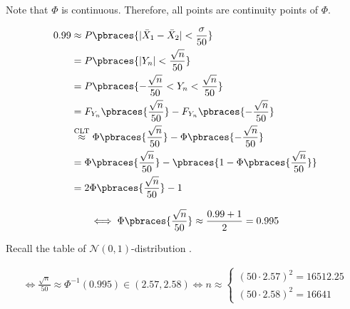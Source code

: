 \begin{solution}
Note that $\Phi$ is continuous.
Therefore, all points are continuity points of $\Phi$.

\begin{align*}
    0.99
    & \approx
    P \pbraces{|\bar X_1 - \bar X_2| < \frac{\sigma}{50}} \\
    & =
    P \pbraces{|Y_n| < \frac{\sqrt n}{50}} \\
    & =
    P \pbraces{-\frac{\sqrt n}{50} < Y_n < \frac{\sqrt n}{50}} \\
    & =
    F_{Y_n} \pbraces{\frac{\sqrt n}{50}} - F_{Y_n} \pbraces{-\frac{\sqrt n}{50}} \\
    & \stackrel
    {
        \text{CLT}
    }{\approx}
    \Phi \pbraces{\frac{\sqrt n}{50}} - \Phi \pbraces{-\frac{\sqrt n}{50}} \\
    & =
    \Phi \pbraces{\frac{\sqrt n}{50}} - \pbraces{1 - \Phi \pbraces{\frac{\sqrt n}{50}}} \\
    & =
    2 \Phi \pbraces{\frac{\sqrt n}{50}} - 1
\end{align*}

\begin{align*}
    \iff
    \Phi \pbraces{\frac{\sqrt n}{50}}
    \approx
    \frac{0.99 + 1}{2}
    =
    0.995
\end{align*}

Recall the table of $\mathcal N(0, 1)$-distribution \cite[Lecture 2, Slide 44]{EStat}.

\begin{align*}
    \iff
    \frac{\sqrt n}{50} \approx \Phi^{-1}(0.995) \in (2.57, 2.58)
    \iff
    n
    \approx
    \begin{cases}
        (50 \cdot 2.57)^2 = 16 512.25 \\
        (50 \cdot 2.58)^2 = 16 641
    \end{cases}
\end{align*}

\end{solution}

